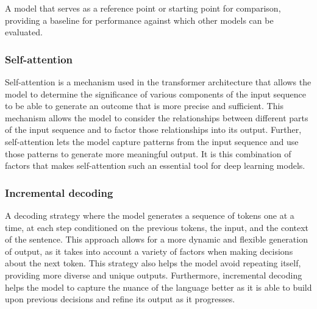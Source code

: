 A model that serves as a reference point or starting point for comparison, providing a baseline for performance against which other models can be evaluated.





\subsubsection{Self-attention}

Self-attention \cite{https://doi.org/10.48550/arxiv.1706.03762} is a mechanism used in the transformer architecture that allows the model to determine the significance of various components of the input sequence to be able to generate an outcome that is more precise and sufficient. This mechanism allows the model to consider the relationships between different parts of the input sequence and to factor those relationships into its output. Further, self-attention lets the model capture patterns from the input sequence and use those patterns to generate more meaningful output. It is this combination of factors that makes self-attention such an essential tool for deep learning models.

\subsubsection{Incremental decoding}

A decoding strategy where the model generates a sequence of tokens one at a time, at each step conditioned on the previous tokens, the input, and the context of the sentence. This approach allows for a more dynamic and flexible generation of output, as it takes into account a variety of factors when making decisions about the next token. This strategy also helps the model avoid repeating itself, providing more diverse and unique outputs. Furthermore, incremental decoding helps the model to capture the nuance of the language better as it is able to build upon previous decisions and refine its output as it progresses\cite{huang-mi-2010-efficient}.

